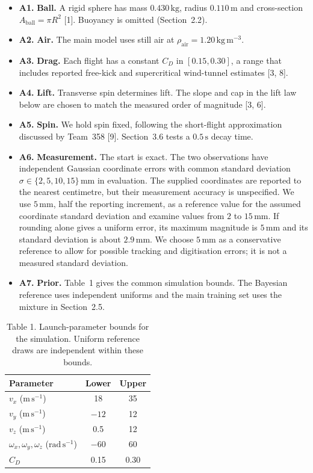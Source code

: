 \begin{itemize}
  \item \textbf{A1.} \textbf{Ball.} A rigid sphere has mass $0.430\,\mathrm{kg}$, radius $0.110\,\mathrm{m}$ and cross-section $A_{\mathrm{ball}}=\pi R^2$ [1]. Buoyancy is omitted (Section~2.2).
  \item \textbf{A2.} \textbf{Air.} The main model uses still air at $\rho_{\mathrm{air}}=1.20\,\mathrm{kg\,m^{-3}}$.
  \item \textbf{A3.} \textbf{Drag.} Each flight has a constant $C_D$ in $[0.15,0.30]$, a range that includes reported free-kick and supercritical wind-tunnel estimates [3, 8].
  \item \textbf{A4.} \textbf{Lift.} Transverse spin determines lift. The slope and cap in the lift law below are chosen to match the measured order of magnitude [3, 6].
  \item \textbf{A5.} \textbf{Spin.} We hold spin fixed, following the short-flight approximation discussed by Team~358 [9]. Section~3.6 tests a $0.5\,\mathrm{s}$ decay time.
  \item \textbf{A6.} \textbf{Measurement.} The start is exact. The two observations have independent Gaussian coordinate errors with common standard deviation $\sigma\in\{2,5,10,15\}\,\mathrm{mm}$ in evaluation. The supplied coordinates are reported to the nearest centimetre, but their measurement accuracy is unspecified. We use $5\,\mathrm{mm}$, half the reporting increment, as a reference value for the assumed coordinate standard deviation and examine values from $2$ to $15\,\mathrm{mm}$. If rounding alone gives a uniform error, its maximum magnitude is $5\,\mathrm{mm}$ and its standard deviation is about $2.9\,\mathrm{mm}$. We choose $5\,\mathrm{mm}$ as a conservative reference to allow for possible tracking and digitisation errors; it is not a measured standard deviation.
  \item \textbf{A7.} \textbf{Prior.} Table~1 gives the common simulation bounds. The Bayesian reference uses independent uniforms and the main training set uses the mixture in Section~2.5.
\end{itemize}

\begin{table}[htbp]
  
  \caption{Table 1. Launch-parameter bounds for the simulation. Uniform reference draws are independent within these bounds.}
  \begin{tabular}{lcc}
    \toprule
    Parameter & Lower & Upper \\
    \midrule
    $v_x$ ($\mathrm{m\,s^{-1}}$) & 18 & 35 \\
    $v_y$ ($\mathrm{m\,s^{-1}}$) & $-12$ & 12 \\
    $v_z$ ($\mathrm{m\,s^{-1}}$) & 0.5 & 12 \\
    $\omega_x,\omega_y,\omega_z$ ($\mathrm{rad\,s^{-1}}$) & $-60$ & 60 \\
    $C_D$ & 0.15 & 0.30 \\
    \bottomrule
  \end{tabular}
\end{table}

